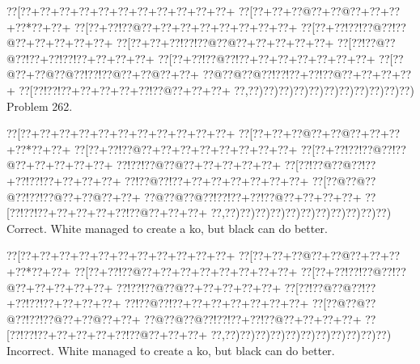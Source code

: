 \documentclass[a5paper]{article}
\begin{document}
\newpage
\begin{center}
{\goo
\0??[\0??+\0??+\0??+\0??+\0??+\0??+\0??+\0??+\0??+\0??+\0??+
\0??[\0??+\0??+\0??@\0??+\0??@\0??+\0??+\0??+\0??*\0??+\0??+
\0??[\0??+\0??!\0??@\0??+\0??+\0??+\0??+\0??+\0??+\0??+\0??+
\0??[\0??+\0??!\0??!\0??@\0??!\0??@\0??+\0??+\0??+\0??+\0??+
\0??[\0??+\0??+\0??!\0??!\0??@\0??@\0??+\0??+\0??+\0??+\0??+
\0??[\0??!\0??@\0??@\0??!\0??+\0??!\0??!\0??+\0??+\0??+\0??+
\0??[\0??+\0??!\0??@\0??!\0??+\0??+\0??+\0??+\0??+\0??+\0??+
\0??[\0??@\0??+\0??@\0??@\0??!\0??!\0??@\0??+\0??@\0??+\0??+
\0??@\0??@\0??@\0??!\0??!\0??+\0??!\0??@\0??+\0??+\0??+\0??+
\0??[\0??!\0??!\0??+\0??+\0??+\0??+\0??!\0??@\0??+\0??+\0??+
\0??,\0??)\0??)\0??)\0??)\0??)\0??)\0??)\0??)\0??)\0??)\0??)
}
Problem 262.

\end{center}
\begin{center}
{\goo
\0??[\0??+\0??+\0??+\0??+\0??+\0??+\0??+\0??+\0??+\0??+\0??+
\0??[\0??+\0??+\0??@\0??+\0??@\0??+\0??+\0??+\0??*\0??+\0??+
\0??[\0??+\0??!\0??@\0??+\0??+\0??+\0??+\0??+\0??+\0??+\0??+
\0??[\0??+\0??!\0??!\0??@\0??!\0??@\0??+\0??+\0??+\0??+\0??+
\0??!\0??!\0??@\0??@\0??+\0??+\0??+\0??+\0??+
\0??[\0??!\0??@\0??@\0??!\0??+\0??!\0??!\0??+\0??+\0??+\0??+
\0??!\0??@\0??!\0??+\0??+\0??+\0??+\0??+\0??+\0??+
\0??[\0??@\0??@\0??@\0??!\0??!\0??@\0??+\0??@\0??+\0??+
\0??@\0??@\0??@\0??!\0??!\0??+\0??!\0??@\0??+\0??+\0??+\0??+
\0??[\0??!\0??!\0??+\0??+\0??+\0??+\0??!\0??@\0??+\0??+\0??+
\0??,\0??)\0??)\0??)\0??)\0??)\0??)\0??)\0??)\0??)\0??)\0??)
}
Correct. White managed to create a ko, but black can do better.

\end{center}
\begin{center}
{\goo
\0??[\0??+\0??+\0??+\0??+\0??+\0??+\0??+\0??+\0??+\0??+\0??+
\0??[\0??+\0??+\0??@\0??+\0??@\0??+\0??+\0??+\0??*\0??+\0??+
\0??[\0??+\0??!\0??@\0??+\0??+\0??+\0??+\0??+\0??+\0??+\0??+
\0??[\0??+\0??!\0??!\0??@\0??!\0??@\0??+\0??+\0??+\0??+\0??+
\0??!\0??!\0??@\0??@\0??+\0??+\0??+\0??+\0??+
\0??[\0??!\0??@\0??@\0??!\0??+\0??!\0??!\0??+\0??+\0??+\0??+
\0??!\0??@\0??!\0??+\0??+\0??+\0??+\0??+\0??+\0??+
\0??[\0??@\0??@\0??@\0??!\0??!\0??@\0??+\0??@\0??+\0??+
\0??@\0??@\0??@\0??!\0??!\0??+\0??!\0??@\0??+\0??+\0??+\0??+
\0??[\0??!\0??!\0??+\0??+\0??+\0??+\0??!\0??@\0??+\0??+\0??+
\0??,\0??)\0??)\0??)\0??)\0??)\0??)\0??)\0??)\0??)\0??)\0??)
}
Incorrect. White managed to create a ko, but black can do better.

\end{center}
\end{document}
